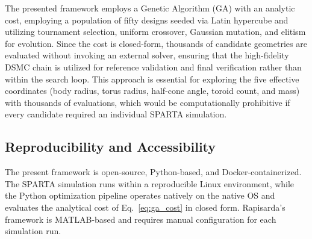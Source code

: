 The presented framework employs a Genetic Algorithm (GA) with an analytic cost, employing a population of fifty designs seeded via Latin hypercube and utilizing tournament selection, uniform crossover, Gaussian mutation, and elitism for evolution. Since the cost is closed-form, thousands of candidate geometries are evaluated without invoking an external solver, ensuring that the high-fidelity DSMC chain is utilized for reference validation and final verification rather than within the search loop. This approach is essential for exploring the five effective coordinates (body radius, torus radius, half-cone angle, toroid count, and mass) with thousands of evaluations, which would be computationally prohibitive if every candidate required an individual SPARTA simulation.


\subsection{Reproducibility and Accessibility}
The present framework is open-source, Python-based, and Docker-containerized. The SPARTA simulation runs within a reproducible Linux environment, while the Python optimization pipeline operates natively on the native OS and evaluates the analytical cost of Eq.~\eqref{eq:ga_cost} in closed form. Rapisarda's framework is MATLAB-based and requires manual configuration for each simulation run.

